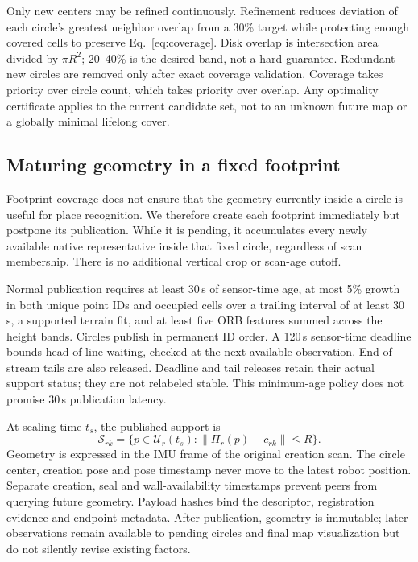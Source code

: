 Only new centers may be refined continuously. Refinement reduces deviation of each circle's greatest neighbor overlap from a 30\% target while protecting enough covered cells to preserve Eq.~\eqref{eq:coverage}. Disk overlap is intersection area divided by $\pi R^2$; 20--40\% is the desired band, not a hard guarantee. Redundant new circles are removed only after exact coverage validation. Coverage takes priority over circle count, which takes priority over overlap. Any optimality certificate applies to the current candidate set, not to an unknown future map or a globally minimal lifelong cover.

\subsection{Maturing geometry in a fixed footprint}
Footprint coverage does not ensure that the geometry currently inside a circle is useful for place recognition. We therefore create each footprint immediately but postpone its publication. While it is pending, it accumulates every newly available native representative inside that fixed circle, regardless of scan membership. There is no additional vertical crop or scan-age cutoff.

Normal publication requires at least 30\,s of sensor-time age, at most 5\% growth in both unique point IDs and occupied cells over a trailing interval of at least 30\,s, a supported terrain fit, and at least five ORB features summed across the height bands. Circles publish in permanent ID order. A 120\,s sensor-time deadline bounds head-of-line waiting, checked at the next available observation. End-of-stream tails are also released. Deadline and tail releases retain their actual support status; they are not relabeled stable. This minimum-age policy does not promise 30\,s publication latency.

At sealing time $t_s$, the published support is
\begin{equation}
 \mathcal{S}_{rk}=\{p\in\mathcal{U}_r(t_s):\|\Pi_r(p)-c_{rk}\|\le R\}.
\end{equation}
Geometry is expressed in the IMU frame of the original creation scan. The circle center, creation pose and pose timestamp never move to the latest robot position. Separate creation, seal and wall-availability timestamps prevent peers from querying future geometry. Payload hashes bind the descriptor, registration evidence and endpoint metadata. After publication, geometry is immutable; later observations remain available to pending circles and final map visualization but do not silently revise existing factors.

